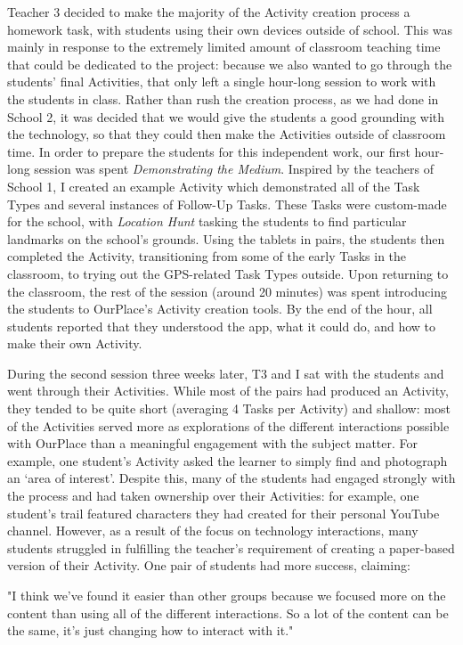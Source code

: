 Teacher 3 decided to make the majority of the Activity creation process a homework task, with students using their own devices outside of school. This was mainly in response to the extremely limited amount of classroom teaching time that could be dedicated to the project: because we also wanted to go through the students' final Activities, that only left a single hour-long session to work with the students in class. Rather than rush the creation process, as we had done in School 2, it was decided that we would give the students a good grounding with the technology, so that they could then make the Activities outside of classroom time. In order to prepare the students for this independent work, our first hour-long session was spent \textit{Demonstrating the Medium}. Inspired by the teachers of School 1, I created an example Activity which demonstrated all of the Task Types and several instances of Follow-Up Tasks. These Tasks were custom-made for the school, with \textit{Location Hunt} tasking the students to find particular landmarks on the school's grounds. Using the tablets in pairs, the students then completed the Activity, transitioning from some of the early Tasks in the classroom, to trying out the GPS-related Task Types outside. Upon returning to the classroom, the rest of the session (around 20 minutes) was spent introducing the students to OurPlace's Activity creation tools. By the end of the hour, all students reported that they understood the app, what it could do, and how to make their own Activity.

During the second session three weeks later, T3 and I sat with the students and went through their Activities. While most of the pairs had produced an Activity, they tended to be quite short (averaging 4 Tasks per Activity) and shallow: most of the Activities served more as explorations of the different interactions possible with OurPlace than a meaningful engagement with the subject matter. For example, one student's Activity asked the learner to simply find and photograph an `area of interest'. Despite this, many of the students had engaged strongly with the process and had taken ownership over their Activities: for example, one student's trail featured characters they had created for their personal YouTube channel. However, as a result of the focus on technology interactions, many students struggled in fulfilling the teacher's requirement of creating a paper-based version of their Activity. One pair of students had more success, claiming:

\begin{displayquote}
"I think we've found it easier than other groups because we focused more on the content than using all of the different interactions. So a lot of the content can be the same, it's just changing how to interact with it."
\end{displayquote}

